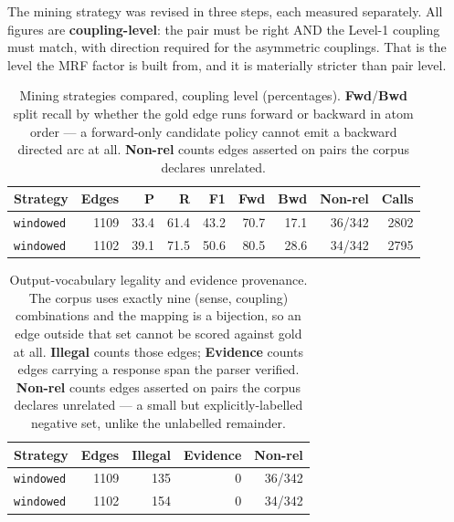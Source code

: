 \documentclass[11pt]{article}
\begin{document}
The mining strategy was revised in three steps, each measured separately. All figures are \textbf{coupling-level}: the pair must be right AND the Level-1 coupling must match, with direction required for the asymmetric couplings. That is the level the MRF factor is built from, and it is materially stricter than pair level.

\begin{table}[htbp]
\centering
\small
\caption{Mining strategies compared, coupling level (percentages). \textbf{Fwd}/\textbf{Bwd} split recall by whether the gold edge runs forward or backward in atom order --- a forward-only candidate policy cannot emit a backward directed arc at all. \textbf{Non-rel} counts edges asserted on pairs the corpus declares unrelated.}
\label{tab:strategy-comparison}
\begin{tabular}{lrrrrrrrr}
\toprule
Strategy & Edges & P & R & F1 & Fwd & Bwd & Non-rel & Calls \\
\midrule
\texttt{windowed} & 1109 & 33.4 & 61.4 & 43.2 & 70.7 & 17.1 & 36/342 & 2802 \\
\texttt{windowed} & 1102 & 39.1 & 71.5 & 50.6 & 80.5 & 28.6 & 34/342 & 2795 \\
\bottomrule
\end{tabular}
\end{table}

\begin{table}[htbp]
\centering
\small
\caption{Output-vocabulary legality and evidence provenance. The corpus uses exactly nine (sense, coupling) combinations and the mapping is a bijection, so an edge outside that set cannot be scored against gold at all. \textbf{Illegal} counts those edges; \textbf{Evidence} counts edges carrying a response span the parser verified. \textbf{Non-rel} counts edges asserted on pairs the corpus declares unrelated --- a small but explicitly-labelled negative set, unlike the unlabelled remainder.}
\label{tab:vocabulary-legality}
\begin{tabular}{lrrrr}
\toprule
Strategy & Edges & Illegal & Evidence & Non-rel \\
\midrule
\texttt{windowed} & 1109 & 135 & 0 & 36/342 \\
\texttt{windowed} & 1102 & 154 & 0 & 34/342 \\
\bottomrule
\end{tabular}
\end{table}
\end{document}
